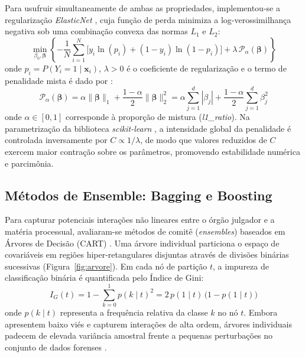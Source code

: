 \documentclass[conference]{IEEEtran}
\begin{document}
Para usufruir simultaneamente de ambas as propriedades, implementou-se a regularização \textit{ElasticNet} \cite{zou2005}, cuja função de perda minimiza a log-verossimilhança negativa sob uma combinação convexa das normas $L_1$ e $L_2$:
\begin{equation}
\min_{\beta_0, \boldsymbol{\beta}} \left\{ -\frac{1}{N} \sum_{i=1}^N \Big[ y_i \ln(p_i) + (1 - y_i) \ln(1 - p_i) \Big] + \lambda \, \mathcal{P}_\alpha(\boldsymbol{\beta}) \right\}
\label{eq:elasticnet}
\end{equation}
onde $p_i = P(Y_i=1 \mid \mathbf{x}_i)$, $\lambda > 0$ é o coeficiente de regularização e o termo de penalidade mista é dado por \cite{zou2005}:
\begin{equation}
\mathcal{P}_\alpha(\boldsymbol{\beta}) = \alpha \|\boldsymbol{\beta}\|_1 + \frac{1 - \alpha}{2} \|\boldsymbol{\beta}\|_2^2 = \alpha \sum_{j=1}^d |\beta_j| + \frac{1 - \alpha}{2} \sum_{j=1}^d \beta_j^2
\label{eq:penalty_mix}
\end{equation}
onde $\alpha \in [0, 1]$ corresponde à proporção de mistura (\textit{l1\_ratio}). Na parametrização da biblioteca \textit{scikit-learn} \cite{pedregosa2011}, a intensidade global da penalidade é controlada inversamente por $C \propto 1/\lambda$, de modo que valores reduzidos de $C$ exercem maior contração sobre os parâmetros, promovendo estabilidade numérica e parcimônia.

\subsection{Métodos de Ensemble: Bagging e Boosting}
Para capturar potenciais interações não lineares entre o órgão julgador e a matéria processual, avaliaram-se métodos de comitê (\textit{ensembles}) baseados em Árvores de Decisão (CART) \cite{izbicki2020}. Uma árvore individual particiona o espaço de covariáveis em regiões hiper-retangulares disjuntas através de divisões binárias sucessivas (Figura~\ref{fig:arvore}). Em cada nó de partição $t$, a impureza de classificação binária é quantificada pelo Índice de Gini:
\begin{equation}
I_G(t) = 1 - \sum_{k=0}^1 p(k \mid t)^2 = 2\,p(1 \mid t)\,\big(1 - p(1 \mid t)\big)
\label{eq:gini}
\end{equation}
onde $p(k \mid t)$ representa a frequência relativa da classe $k$ no nó $t$. Embora apresentem baixo viés e capturem interações de alta ordem, árvores individuais padecem de elevada variância amostral frente a pequenas perturbações no conjunto de dados forenses \cite{izbicki2020}.
\end{document}
